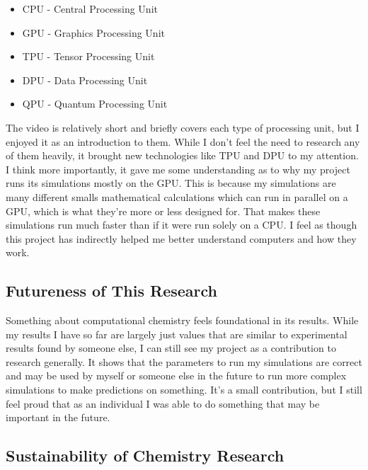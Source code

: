 \documentclass[11pt]{article}
\begin{document}
\begin{itemize}
\item CPU - Central Processing Unit
\item GPU - Graphics Processing Unit
\item TPU - Tensor Processing Unit
\item DPU - Data Processing Unit
\item QPU - Quantum Processing Unit
\end{itemize}

The video is relatively short and briefly covers each type of processing unit, but I enjoyed it as an introduction to them. While I don't feel the need to research any of them heavily, it brought new technologies like TPU and DPU to my attention. I think more importantly, it gave me some understanding as to why my project runs its simulations mostly on the GPU. This is because my simulations are many different smalls mathematical calculations which can run in parallel on a GPU, which is what they're more or less designed for. That makes these simulations run much faster than if it were run solely on a CPU. I feel as though this project has indirectly helped me better understand computers and how they work.

\subsection{Futureness of This Research}

Something about computational chemistry feels foundational in its results. While my results I have so far are largely just values that are similar to experimental results found by someone else, I can still see my project as a contribution to research generally. It shows that the parameters to run my simulations are correct and may be used by myself or someone else in the future to run more complex simulations to make predictions on something. It's a small contribution, but I still feel proud that as an individual I was able to do something that may be important in the future.

\subsection{Sustainability of Chemistry Research}
\end{document}
